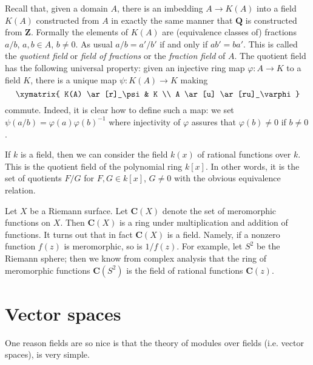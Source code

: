 \begin{example}
\label{example-quotient-field}
Recall that, given a domain $A$, there is an imbedding $A \to K(A)$ into a
field $K(A)$ constructed from $A$ in exactly the same manner that
$\mathbf{Q}$ is constructed from $\mathbf{Z}$. Formally the elements
of $K(A)$ are (equivalence classes of) fractions $a/b$,
$a, b \in A$, $b \not = 0$. As usual $a/b = a'/b'$ if and only if $ab' = ba'$.
This is called the {\it quotient field} or {\it field of fractions} or
the {\it fraction field} of $A$.
The quotient field has the following universal property: given an
injective ring map $\varphi : A \to K$ to a field $K$, there is a unique
map $\psi: K(A) \to K$ making
$$
\xymatrix{
K(A) \ar[r]_\psi & K \\
A \ar[u] \ar[ru]_\varphi
}
$$
commute. Indeed, it is clear how to define such a map: we set
$\psi(a/b) = \varphi(a)\varphi(b)^{-1}$ where injectivity of $\varphi$
assures that $\varphi(b) \not = 0$ if $ b \not = 0$.
\end{example}

\begin{example}
\label{example-field-of-rational-functions}
If $k$ is a field, then we can consider the field $k(x)$ of rational
functions over $k$. This is the quotient field of the polynomial ring
$k[x]$. In other words, it is the set of quotients $F/G$ for
$F, G \in k[x]$, $G \not = 0$ with the obvious equivalence relation.
\end{example}

\begin{example}
\label{example-field-of-meromorphic-functions}
Let $X$ be a Riemann surface. Let $\mathbf{C}(X)$ denote the
set of meromorphic functions on $X$. Then $\mathbf{C}(X)$ is a ring under
multiplication and addition of functions. It turns out that in fact
$\mathbf{C}(X)$ is a field. Namely, if a nonzero function $f(z)$ is
meromorphic, so is $1/f(z)$. For example, let $S^2$ be the Riemann
sphere; then we know from complex analysis that the ring of meromorphic
functions $\mathbf{C}(S^2)$ is the field of rational functions $\mathbf{C}(z)$.
\end{example}



\section{Vector spaces}
\label{section-vector-spaces}

\noindent
One reason fields are so nice is that the theory of modules over fields
(i.e. vector spaces), is very simple.

